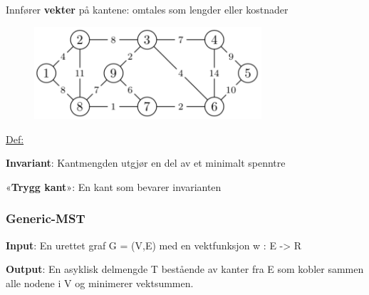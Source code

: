 \documentclass[12pt]{report}
\begin{document}

\par


\vspace{\baselineskip}
Innfører \textbf{vekter} på kantene: omtales som lengder eller kostnader\par




\begin{figure}[H]
	\begin{Center}
		\includegraphics[width=3.32in,height=1.35in]{./media/image113.png}
	\end{Center}
\end{figure}



\par


\vspace{\baselineskip}
\uline{Def:}\par

\textbf{Invariant}: Kantmengden utgjør en del av et minimalt spenntre\par

«\textbf{Trygg kant}»: En kant som bevarer invarianten\par

\subsubsection*{Generic-MST}
\textbf{Input}: En urettet graf G = (V,E) med en vektfunksjon w : E -> R\par

\textbf{Output}: En asyklisk delmengde T bestående av kanter fra E som kobler sammen alle nodene i V og minimerer vektsummen. \par



\end{document}
